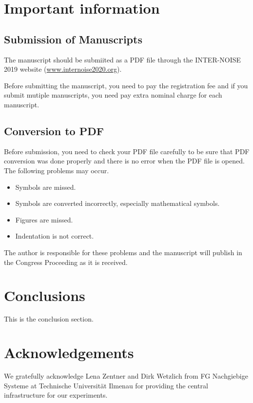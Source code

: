 \documentclass[a4paper,12pt]{article}
\begin{document}
\section{Important information}

\subsection{Submission of Manuscripts}

The manuscript should be submiited as a PDF file through the INTER-NOISE 2019 website
(\url{www.internoise2020.org}). \par
Before submitting the manuscript, you need to pay the registration fee and if you submit mutiple manuscripts, you need pay extra nominal charge for each manuscript.


\subsection{Conversion to PDF}

Before submission, you need to check your PDF file carefully to be sure that PDF conversion was
done properly and there is no error when the PDF file is opened. 
The following problems may occur.

\begin{itemize}
\item Symbols are missed.
\item Symbols are converted incorrectly, especially mathematical symbols.
\item Figures are missed.
\item Indentation is not correct.
\end{itemize}

The author is responsible for these problems and the manuscript will publish in the Congress Proceeding as it is received.

\section{Conclusions}
This is the conclusion section.

\fi

\section{Acknowledgements}
We gratefully acknowledge Lena Zentner and Dirk Wetzlich from FG Nachgiebige Systeme at Technische Universität Ilmenau for providing the central infrastructure for our experiments.



 

\end{document}
